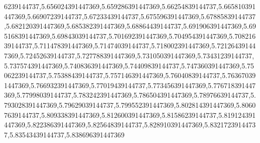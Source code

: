 6239144737,5.656024391447369,5.659286391447369,5.66254839144737,5.665810391447369,5.66907239144737,5.67233439144737,5.675596391447369,5.67885839144737,5.682120391447369,5.685382391447369,5.68864439144737,5.691906391447369,5.695168391447369,5.69843039144737,5.701692391447369,5.704954391447369,5.70821639144737,5.711478391447369,5.71474039144737,5.718002391447369,5.721264391447369,5.72452639144737,5.727788391447369,5.731050391447369,5.73431239144737,5.737574391447369,5.740836391447369,5.74409839144737,5.747360391447369,5.75062239144737,5.75388439144737,5.757146391447369,5.76040839144737,5.763670391447369,5.766932391447369,5.77019439144737,5.773456391447369,5.776718391447369,5.77998039144737,5.783242391447369,5.786504391447369,5.78976639144737,5.793028391447369,5.79629039144737,5.799552391447369,5.802814391447369,5.80607639144737,5.809338391447369,5.812600391447369,5.81586239144737,5.819124391447369,5.822386391447369,5.82564839144737,5.828910391447369,5.83217239144737,5.83543439144737,5.838696391447369
